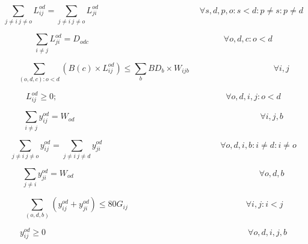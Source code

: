 \begin{equation}
\sum_{j \neq i \ j \neq o} L_{ij}^{od} = \sum_{j \neq i \ j \neq o} L_{ji}^{od}
\qquad \qquad \qquad \qquad \qquad \qquad
\forall s,d,p,o : s < d : p \neq s : p \neq d
\label{ILPTransluc2}
\end{equation}

\begin{equation}
\sum_{i \neq j} L_{ji}^{od} = D_{odc}
\qquad \qquad \qquad \qquad \qquad \qquad \qquad \qquad
\forall o,d,c : o < d
\label{ILPTransluc3}
\end{equation}

\begin{equation}
\sum_{(o,d,c): o<d} (B(c) \times L_{ij}^{od}) \leq  \sum_{b} BD_b \times W_{ijb}
\qquad \qquad \qquad \qquad \qquad
\forall i,j
\label{ILPTransluc4}
\end{equation}

\begin{equation}
L_{ij}^{od} \geq 0;
\qquad \qquad \qquad \qquad \qquad \qquad \qquad \qquad \qquad \qquad
\forall o,d,i,j : o < d
\label{ILPTransluc5}
\end{equation}

\begin{equation}
\sum_{i \neq j} y_{ij}^{od} = W_{od}
\qquad \qquad \qquad \qquad \qquad \qquad \qquad \qquad \qquad \qquad \qquad
\forall i,j,b
\label{ILPTransluc6}
\end{equation}

\begin{equation}
\sum_{j\neq i \ j\neq o} y_{ij}^{od} = \sum_{j \neq i \ j \neq d} y_{ji}^{od}
\qquad \qquad \qquad \qquad \qquad \qquad \qquad
\forall o,d,i,b : i \neq d : i \neq o
\label{ILPTransluc7}
\end{equation}

\begin{equation}
\sum_{j \neq i} y_{ji}^{od} = W_{od}
\qquad \qquad \qquad \qquad \qquad \qquad \qquad \qquad \qquad \qquad \qquad
\forall o,d,b
\label{ILPTransluc8}
\end{equation}

\begin{equation}
\sum_{(o,d,b)} \left( y_{ij}^{od} + y_{ji}^{od}\right) \leq 80 G_{ij}
\qquad \qquad \qquad \qquad \qquad \qquad \qquad
\forall i,j : i < j
\label{ILPTransluc9}
\end{equation}

\begin{equation}
y_{ij}^{od} \geq 0
\qquad \qquad \qquad \qquad \qquad \qquad \qquad \qquad \qquad \qquad \qquad \qquad
\forall o,d,i,j,b
\label{ILPTransluc10}
\end{equation}	


